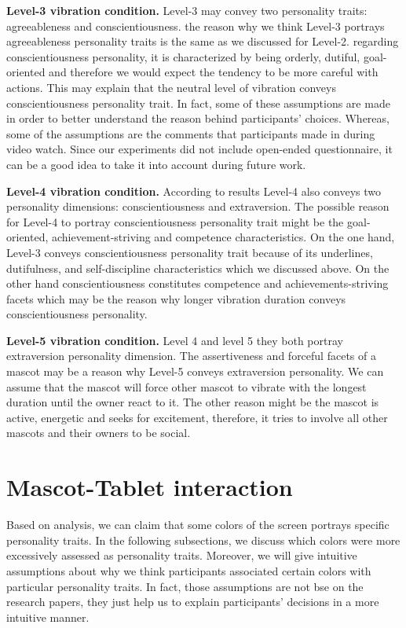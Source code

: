 \par\textbf{Level-3 vibration condition.}
Level-3 may convey two personality traits: agreeableness and conscientiousness.
the reason why we think Level-3 portrays agreeableness personality traits is the same as we discussed for Level-2.
regarding conscientiousness personality, it is characterized by being orderly, dutiful, goal-oriented and
therefore we would expect the tendency to be more careful with actions.
This may explain that the neutral level of vibration conveys conscientiousness personality trait.
In fact, some of these assumptions are made in order to better understand the reason behind participants' choices.
Whereas, some of the assumptions are the comments that participants made in during video watch.
Since our experiments did not include open-ended questionnaire, it can be a good idea
to take it into account during future work.

\par\textbf{Level-4 vibration condition.}
According to results Level-4 also conveys two personality dimensions: conscientiousness and extraversion.
The possible reason for Level-4 to portray conscientiousness personality trait might be the
goal-oriented, achievement-striving and competence characteristics.
On the one hand, Level-3 conveys conscientiousness personality trait because of its
underlines, dutifulness, and self-discipline characteristics which we discussed above.
On the other hand conscientiousness constitutes competence and achievements-striving facets which may be the reason
why longer vibration duration conveys conscientiousness personality.

\par\textbf{Level-5 vibration condition.}
Level 4 and level 5 they both portray extraversion personality dimension.
The assertiveness and forceful facets of a mascot may be a reason why Level-5 conveys extraversion personality.
We can assume that the mascot will force other mascot to vibrate with the longest duration until the owner react to it.
The other reason might be the mascot is active, energetic and seeks for excitement,
therefore, it tries to involve all other mascots and their owners to be social.

\section{Mascot-Tablet interaction}
\label{sec:mascot-tablet-interaction}
Based on analysis, we can claim that some colors of the screen portrays specific personality traits.
In the following subsections, we discuss which colors were more excessively assessed as personality traits.
Moreover, we will give intuitive assumptions about why we think participants
associated certain colors with particular personality traits.
In fact, those assumptions are not bse on the research papers, they just help us to explain participants’
decisions in a more intuitive manner.

